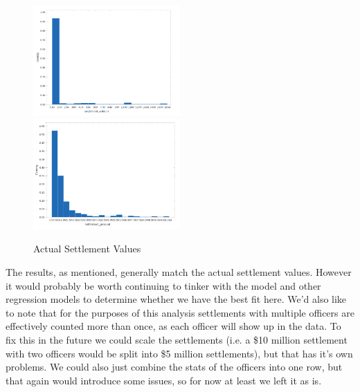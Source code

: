 \documentclass[11pt]{article}
\begin{document}
\begin{figure}[h]
\caption{Actual Settlement Values}
\includegraphics[width=0.5\textwidth]{actual.png}
\includegraphics[width=0.5\textwidth]{actual2.png}
\end{figure}

The results, as mentioned, generally match the actual settlement values. However it would probably be worth continuing to tinker with the model and other regression models to determine whether we have the best fit here. We'd also like to note that for the purposes of this analysis settlements with multiple officers are effectively counted more than once, as each officer will show up in the data. To fix this in the future we could scale the settlements (i.e. a \$10 million settlement with two officers would be split into \$5 million settlements), but that has it's own problems. We could also just combine the stats of the officers into one row, but that again would introduce some issues, so for now at least we left it as is.
\end{document}
